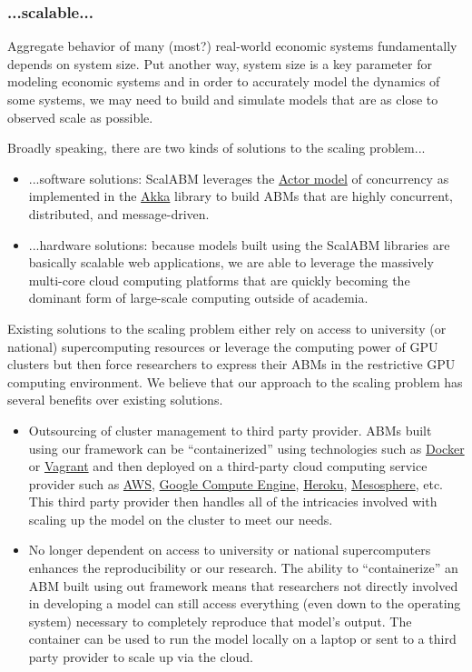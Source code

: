 \documentclass[11pt]{amsart}
\begin{document}
\subsubsection{...scalable...}
Aggregate behavior of many (most?) real-world economic systems fundamentally depends on system size. Put another way, system size is a key parameter for modeling economic systems and in order to accurately model the dynamics of some systems, we may need to build and simulate models that are as close to observed scale as possible. 

Broadly speaking, there are two kinds of solutions to the scaling problem...
\begin{itemize}
    \item ...software solutions: ScalABM leverages the \href{https://en.wikipedia.org/wiki/Actor_model}{Actor model} of concurrency as implemented in the \href{http://akka.io/}{Akka} library to build ABMs that are highly concurrent, distributed, and message-driven.
    \item ...hardware solutions:  because models built using the ScalABM libraries are basically scalable web applications, we are able to leverage the massively multi-core cloud computing platforms that are quickly becoming the dominant form of large-scale computing outside of academia.
\end{itemize}

Existing solutions to the scaling problem either rely on access to university (or national) supercomputing resources or leverage the computing power of GPU clusters but then force researchers to express their ABMs in the restrictive GPU computing environment. We believe that our approach to the scaling problem has several benefits over existing solutions.
\begin{itemize}
    \item Outsourcing of cluster management to third party provider. ABMs built using our framework can be ``containerized'' using technologies such as \href{https://www.docker.com/}{Docker} or \href{https://www.vagrantup.com/}{Vagrant} and then deployed on a third-party cloud computing service provider such as \href{http://aws.amazon.com/}{AWS}, \href{https://cloud.google.com/compute/}{Google Compute Engine}, \href{https://www.heroku.com/}{Heroku}, \href{https://mesosphere.com/}{Mesosphere}, etc. This third party provider then handles all of the intricacies involved with scaling up the model on the cluster to meet our needs.
    \item No longer dependent on access to university or national supercomputers enhances the reproducibility or our research.  The ability to ``containerize'' an ABM built using out framework means that researchers not directly involved in developing a model can still access everything (even down to the operating system) necessary to completely reproduce that model's output. The container can be used to run the model locally on a laptop or sent to a third party provider to scale up via the cloud.
\end{itemize}
\end{document}
